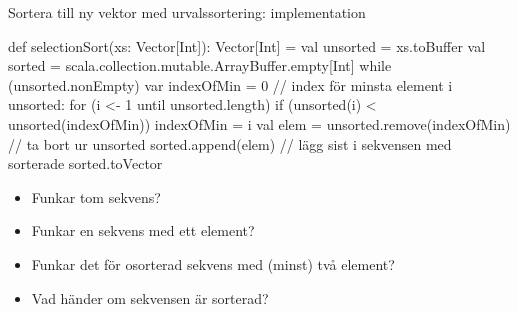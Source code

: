 \begin{Slide}{Sortera till ny vektor med urvalssortering: implementation} %
\SlideFontTiny\vspace{-0.5em}
\begin{Code}
def selectionSort(xs: Vector[Int]): Vector[Int] = {
  val unsorted = xs.toBuffer
  val sorted = scala.collection.mutable.ArrayBuffer.empty[Int]
  while (unsorted.nonEmpty) {
    var indexOfMin = 0
    // index för minsta element i unsorted:
    for (i <- 1 until unsorted.length) {
      if (unsorted(i) < unsorted(indexOfMin)) indexOfMin = i
    }
    val elem = unsorted.remove(indexOfMin)  // ta bort ur unsorted
    sorted.append(elem)  // lägg sist i sekvensen med sorterade
  }
  sorted.toVector
}
\end{Code}
\pause
\begin{itemize}
\item Funkar tom sekvens?
\item Funkar en sekvens med ett element?
\item Funkar det för osorterad sekvens med (minst) två element?
\item Vad händer om sekvensen är sorterad?
\end{itemize}
\end{Slide}


